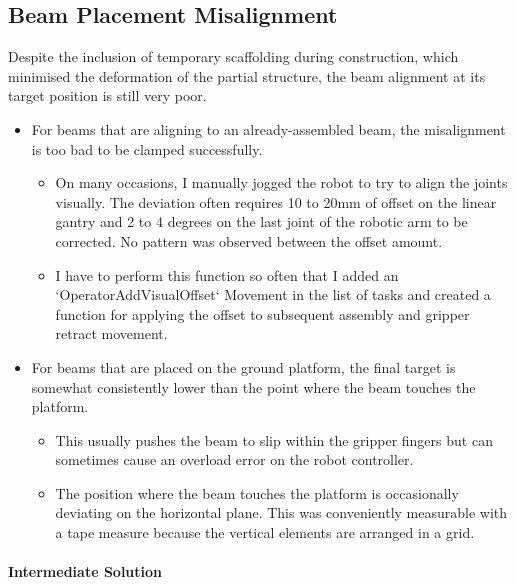 {\begin{itemize}
\end{itemize}
\subsection{Beam Placement Misalignment}
\label{subsection:exploration_3_beam_placement_misalignment}

Despite the inclusion of temporary scaffolding during construction, which minimised the deformation of the partial structure, the beam alignment at its target position is still very poor.

\begin{itemize}
	\item For beams that are aligning to an already-assembled beam, the misalignment is too bad to be clamped successfully. 

\begin{itemize}
	\item On many occasions, I manually jogged the robot to try to align the joints visually. The deviation often requires 10 to 20mm of offset on the linear gantry and 2 to 4 degrees on the last joint of the robotic arm to be corrected. No pattern was observed between the offset amount.

	\item I have to perform this function so often that I added an `OperatorAddVisualOffset` Movement in the list of tasks and created a function for applying the offset to subsequent assembly and gripper retract movement. 

\end{itemize}
	\item For beams that are placed on the ground platform, the final target is somewhat consistently lower than the point where the beam touches the platform. 

\begin{itemize}
	\item This usually pushes the beam to slip within the gripper fingers but can sometimes cause an overload error on the robot controller.

	\item The position where the beam touches the platform is occasionally deviating on the horizontal plane. This was conveniently measurable with a tape measure because the vertical elements are arranged in a grid.

\end{itemize}
\end{itemize}

\paragraph{Intermediate Solution}

}

